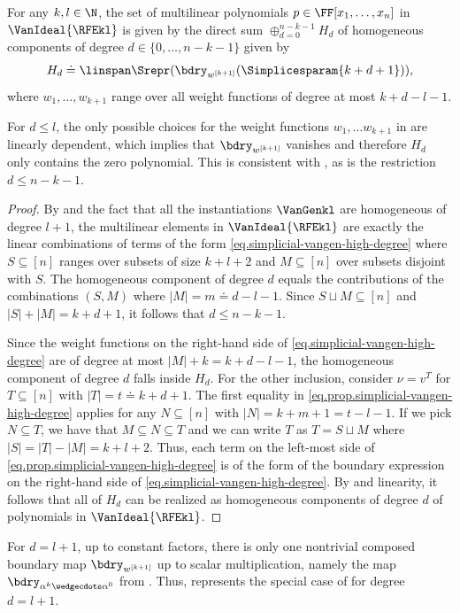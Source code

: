 \documentclass{toc}
\begin{document}
\begin{corollary}
  \label{cor.simplicial-vangen-high-degree}
  For any \(k,l \in \N\), the set of multilinear polynomials $p \in \FF[x_1,\dots,x_n]$ in \(\VanIdeal{\RFEkl}\) is given by the direct sum $\oplus_{d=0}^{n-k-1} H_d$ of homogeneous components of degree $d \in \{0,\dots,n-k-1\}$ given by 
  \begin{equation}\label{eq.cor.simplicial-vangen-high-degree}
  H_d \doteq \linspan \Srepr (\bdry_{w^{[k+1]}}(\Simplicesparam{k+d+1})), 
  \end{equation}
  where $w_1, \dots, w_{k+1}$ range over all weight functions of degree at most $k+d-l-1$.
\end{corollary}
For $d \le l$, the only possible choices for the weight functions $w_1, \dots w_{k+1}$ in  are linearly dependent, which implies that $\bdry_{w^{[k+1]}}$ vanishes and therefore $H_d$ only contains the zero polynomial. This is consistent with , as is the restriction $d \le n-k-1$.
\begin{proof}
By  and the fact that all the instantiations $\VanGenkl$ are homogeneous of degree $l+1$, the multilinear elements in \(\VanIdeal{\RFEkl}\) are exactly the linear combinations of terms of the form \eqref{eq.simplicial-vangen-high-degree} where $S \subseteq [n]$ ranges over subsets of size $k+l+2$ and $M \subseteq [n]$ over subsets disjoint with $S$. The homogeneous component of degree $d$ equals the contributions of the combinations $(S,M)$ where $|M|=m \doteq d-l-1$. Since $S \sqcup M \subseteq [n]$ and $|S|+|M|=k+d+1$, it follows that $d \le n-k-1$.

Since the weight functions on the right-hand side of \eqref{eq.simplicial-vangen-high-degree} are of degree at most $|M|+k=k+d-l-1$, the homogeneous component of degree $d$ falls inside $H_d$. For the other inclusion, consider $\nu=v^T$ for $T \subseteq [n]$ with $|T|=t \doteq k+d+1$. The first equality in \eqref{eq.prop.simplicial-vangen-high-degree} applies for any $N \subseteq [n]$ with $|N|=k+m+1=t-l-1$. If we pick $N \subseteq T$, we have that $M \subseteq N \subseteq T$ and we can write $T$ as $T = S \sqcup M$ where $|S| = |T|-|M| = k+l+2$. Thus, each term on the left-most side of \eqref{eq.prop.simplicial-vangen-high-degree} is of the form of the boundary expression on the right-hand side of 
\eqref{eq.simplicial-vangen-high-degree}. By  and linearity, it follows that all of $H_d$ can be realized as homogeneous components of degree $d$ of polynomials in $\VanIdeal{\RFEkl}$.
\end{proof}
For $d=l+1$, up to constant factors, there is only one nontrivial composed boundary map $\bdry_{w^{[k+1]}}$ up to scalar multiplication, namely the map $\bdry_{\alpha^k\wedgecdots\alpha^0}$ from . Thus,  represents the special case of  for degree $d=l+1$. 
\end{document}
